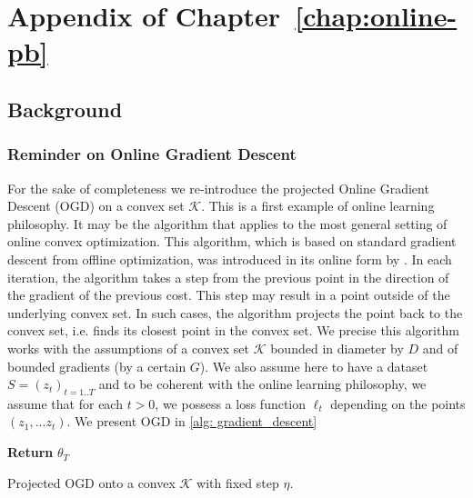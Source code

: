 \chapter{Appendix of Chapter~\ref{chap:online-pb}}
\label{ap: online-pb}

\begin{noaddcontents}

\section{Background}

\subsection{Reminder on Online Gradient Descent }
\label{sec: OGD_reminder}

For the sake of completeness we re-introduce the projected Online Gradient Descent (OGD) on a convex set $\mathcal{K}$. This is a first example of online learning philosophy. It may be the algorithm that applies to the most general setting
of online convex optimization. This algorithm,
which is based on standard gradient descent from offline optimization, was
introduced in its online form by \cite{zinkevich2003online}.
In each iteration, the algorithm takes a step from the previous point in
the direction of the gradient of the previous cost. This step may result in
a point outside of the underlying convex set. In such cases, the algorithm
projects the point back to the convex set, i.e. finds its closest point in the
convex set. We precise this algorithm works with the assumptions of a convex set $\mathcal{K}$ bounded in diameter by $D$ and of bounded gradients (by a certain $G$).
We also assume here to have a dataset $S=(z_t)_{t=1..T}$ and to be coherent with the online learning philosophy, we assume that for each $t>0$, we possess a loss function $\ell_t$ depending on the points $(z_1,...z_t)$. We present OGD in \cref{alg: gradient_descent}


\begin{algorithm}[ht]
 \SetAlgoLined
\textbf{Return} $\theta_{T}$
 \caption{Projected OGD onto a convex $\mathcal{K}$ with fixed step $\eta$.}
 \label{alg: gradient_descent}
 \end{algorithm}


\end{noaddcontents}
